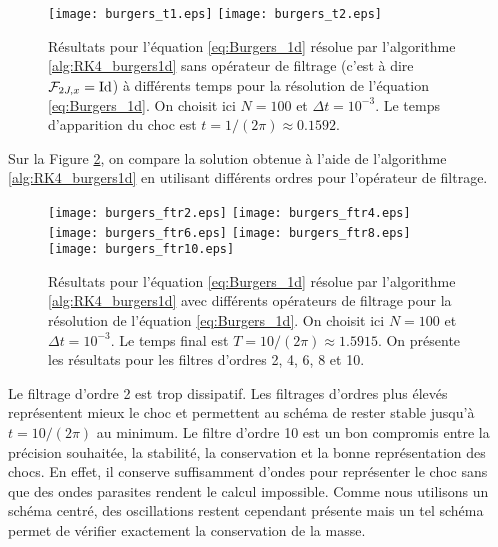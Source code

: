 \begin{figure}[htbp]
\begin{center}
\texttt{[image: burgers\_t1.eps]}
\texttt{[image: burgers\_t2.eps]}
\end{center}
\caption{Résultats pour l'équation \eqref{eq:Burgers_1d} résolue par l'algorithme \ref{alg:RK4_burgers1d} sans opérateur de filtrage (c'est à dire $\mathcal{F}_{2J,x} = \text{Id}$) à différents temps pour la résolution de l'équation \eqref{eq:Burgers_1d}. On choisit ici $N=100$ et $\Delta t = 10^{-3}$. Le temps d'apparition du choc est $t=1/(2\pi) \approx 0.1592$.}
\label{fig:comp_burgers}
\end{figure}

Sur la Figure \ref{fig:comp_burgers_ftr}, on compare la solution obtenue à l'aide de l'algorithme \ref{alg:RK4_burgers1d} en utilisant différents ordres pour l'opérateur de filtrage.

\begin{figure}[htbp]
\begin{center}
\texttt{[image: burgers\_ftr2.eps]}
\texttt{[image: burgers\_ftr4.eps]}\\
\texttt{[image: burgers\_ftr6.eps]}
\texttt{[image: burgers\_ftr8.eps]}\\
\texttt{[image: burgers\_ftr10.eps]}
\end{center}
\caption{Résultats pour l'équation \eqref{eq:Burgers_1d} résolue par l'algorithme \ref{alg:RK4_burgers1d} avec différents opérateurs de filtrage pour la résolution de l'équation \eqref{eq:Burgers_1d}. On choisit ici $N=100$ et $\Delta t = 10^{-3}$. Le temps final est $T= 10/(2\pi) \approx 1.5915$. On présente les résultats pour les filtres d'ordres 2, 4, 6, 8 et 10.}
\label{fig:comp_burgers_ftr}
\end{figure}

Le filtrage d'ordre 2 est trop dissipatif. Les filtrages d'ordres plus élevés représentent mieux le choc et permettent au schéma de rester stable jusqu'à $t=10/(2 \pi)$ au minimum. Le filtre d'ordre 10 est un bon compromis entre la précision souhaitée, la stabilité, la conservation et la bonne représentation des chocs. En effet, il conserve suffisamment d'ondes pour représenter le choc sans que des ondes parasites rendent le calcul impossible. Comme nous utilisons un schéma centré, des oscillations restent cependant présente mais un tel schéma permet de vérifier exactement la conservation de la masse.




























